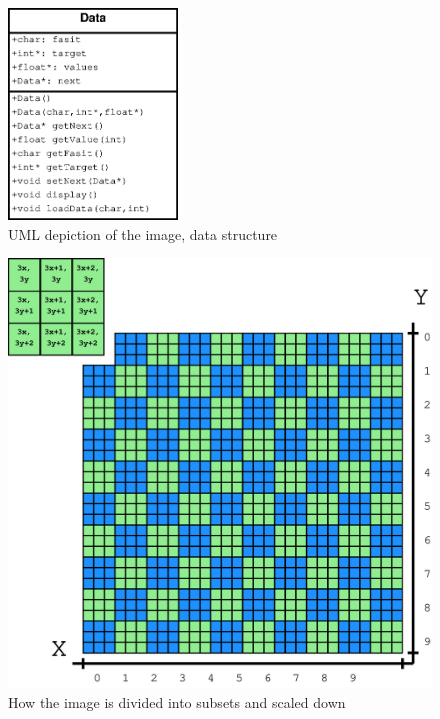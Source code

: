 \begin{figure}[h]
\centering
\includegraphics[width={0.4\textwidth}]{pictures/uml_data}
\caption{UML depiction of the image, data structure}
\label{fig:uml_data}
\end{figure}

\begin{figure}[h]
\centering
\includegraphics[width={1\textwidth}]{pictures/imgSubset}
\caption{How the image is divided into subsets and scaled down}
\label{fig:imgSubset}
\end{figure}


